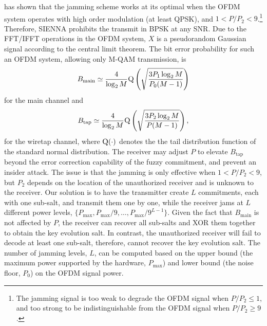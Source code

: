 \cite{GollakotaPhysicalLayerWireless2011} has shown that the jamming scheme works at its optimal when the OFDM system operates with high order modulation (at least QPSK), and $1 < P/P_2 < 9$.\footnote{The jamming signal is too weak to degrade the OFDM signal when $P/P_2 \leq 1$, and too strong to be indistinguishable from the OFDM signal when  $P/P_2 \ge 9$.} Therefore, SIENNA prohibits the transmit in BPSK at any SNR. Due to the FFT/IFFT operations in the OFDM system, $X$ is a pseudorandom Gaussian signal according to the central limit theorem. The bit error probability for such an OFDM system, allowing only M-QAM transmission, is 
\[
B_{\text{main}} \simeq \frac{4}{\log_2{M}}\textsc{Q}\left( \sqrt{\frac{3 P_1 \log_2{M}}{P_0(M-1)}} \right)
\]
for the main channel and 
\[
B_{\text{tap}} \simeq \frac{4}{\log_2{M}}\textsc{Q}\left( \sqrt{\frac{3 P_2 \log_2{M}}{P(M-1)}} \right),
\]
for the wiretap channel, where $\textsc{Q}(\cdot)$ denotes the the tail distribution function of the standard normal distribution. The receiver may adjust $P$ to elevate $B_{\text{tap}}$ beyond the error correction capability of the fuzzy commitment, and prevent an insider attack. The issue is that the jamming is only effective when $1 < P/P_2 < 9$, but $P_2$ depends on the location of the unauthorized receiver and is unknown to the receiver. Our solution is to have the transmitter create $L$ commitments, each with one sub-salt, and transmit them one by one, while the receiver jams at $L$ different power levels, $\{P_{\text{max}}, P_{\text{max}}/9, \ldots, P_{\text{max}}/9^{L-1}\}$. Given the fact that $B_{\text{main}}$ is not affected by $P$, the receiver can recover all sub-salts and XOR them together to obtain the key evolution salt. In contrast, the unauthorized receiver will fail to decode at least one sub-salt, therefore, cannot recover the key evolution salt. The number of jamming levels, $L$, can be computed based on the upper bound (the maximum power supported by the hardware, $P_{\text{max}}$) and lower bound (the noise floor, $P_0$) on the OFDM signal power. 